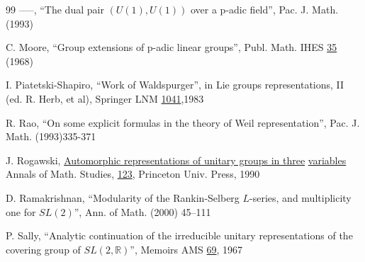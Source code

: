 \documentclass[12pt,letterpaper]{book}
\theoremstyle{plain}
\theoremstyle{definition}
\theoremstyle{remark}
\theoremstyle{remark}
\begin{document}
\begin{thebibliography}{99}
 -----, ``The dual pair $(U(1),U(1))$ over a p-adic field'',
Pac. J. Math. (1993)

 C. Moore, ``Group extensions of p-adic linear groups'',
Publ. Math. IHES \underline{35} (1968)


 I. Piatetski-Shapiro, ``Work of Waldspurger'', in Lie groups
representations, II (ed. R. Herb, et al), Springer LNM
\underline{1041},1983



 R. Rao, ``On some explicit formulas in the theory
of Weil representation'', Pac. J. Math. (1993)335-371


 J. Rogawski,
\underline{Automorphic representations of unitary groups
in three} \underline{variables}
Annals of Math. Studies, \underline{123}, Princeton Univ. Press, 1990


 D. Ramakrishnan, ``Modularity of the Rankin-Selberg
$L$-series, and multiplicity one for $SL(2)$'', Ann. of Math.
 (2000) 45--111

 P. Sally, ``Analytic continuation of the irreducible unitary
representations of the covering group of $SL(2,{\mathbb{R}})$'', Memoirs AMS
\underline{69}, 1967




\end{thebibliography}
\end{document}
